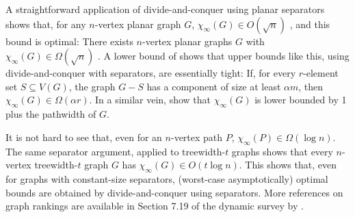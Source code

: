 \documentclass[kpfonts]{patmorin}
\theoremstyle{named}
\begin{document}
A straightforward application of divide-and-conquer using planar separators shows that, for any $n$-vertex planar graph $G$, $\chi_\infty(G) \in O(\sqrt{n})$ \cite{llewellyn.tovey.ea:local,katchalski.mccuaig.ea:ordered}, and this bound is optimal:  There exists $n$-vertex planar graphs $G$ with $\chi_\infty(G)\in \Omega(\sqrt{n})$ \cite{katchalski.mccuaig.ea:ordered}.  A lower bound of \citet{katchalski.mccuaig.ea:ordered} shows that upper bounds like this, using divide-and-conquer with separators, are essentially tight: If, for every $r$-element set $S\subseteq V(G)$, the graph $G-S$ has a component of size at least $\alpha m$, then $\chi_\infty(G) \in\Omega(\alpha r)$. In a similar vein, \citet{bodlaender.gilbert.ea:approximating,kloks:treewidth} show that $\chi_\infty(G)$ is lower bounded by 1 plus the pathwidth of $G$.

It is not hard to see that, even for an $n$-vertex path $P$, $\chi_\infty(P)\in\Omega(\log n)$.  The same separator argument, applied to treewidth-$t$ graphs shows that every $n$-vertex treewidth-$t$ graph $G$ has $\chi_\infty(G)\in O(t\log n)$.  This shows that, even for graphs with constant-size separators, (worst-case asymptotically) optimal bounds are obtained by divide-and-conquer using separators.  More references on graph rankings are available in Section 7.19 of the dynamic survey by \citet{gallian:dynamic}.
\end{document}
